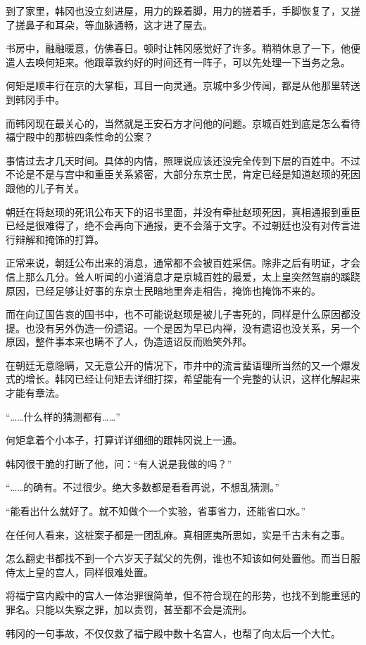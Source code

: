 到了家里，韩冈也没立刻进屋，用力的跺着脚，用力的搓着手，手脚恢复了，又搓了搓鼻子和耳朵，等血脉通畅，这才进了屋去。

书房中，融融暖意，仿佛春日。顿时让韩冈感觉好了许多。稍稍休息了一下，他便遣人去唤何矩来。他跟章敦约好的时间还有一阵子，可以先处理一下当务之急。

何矩是顺丰行在京的大掌柜，耳目一向灵通。京城中多少传闻，都是从他那里转送到韩冈手中。

而韩冈现在最关心的，当然就是王安石方才问他的问题。京城百姓到底是怎么看待福宁殿中的那桩四条性命的公案？

事情过去才几天时间。具体的内情，照理说应该还没完全传到下层的百姓中。不过不论是不是与宫中和重臣关系紧密，大部分东京士民，肯定已经是知道赵顼的死因跟他的儿子有关。

朝廷在将赵顼的死讯公布天下的诏书里面，并没有牵扯赵顼死因，真相通报到重臣已经是很难得了，绝不会再向下通报，更不会落于文字。不过朝廷也没有对传言进行辩解和掩饰的打算。

正常来说，朝廷公布出来的消息，通常都不会被百姓采信。除非之后有明证，才会信上那么几分。耸人听闻的小道消息才是京城百姓的最爱，太上皇突然驾崩的蹊跷原因，已经足够让好事的东京士民暗地里奔走相告，掩饰也掩饰不来的。

而在向辽国告哀的国书中，也不可能说赵顼是被儿子害死的，同样是什么原因都没提。也没有另外伪造一份遗诏。一个是因为早已内禅，没有遗诏也没关系，另一个原因，整件事本来也瞒不了人，伪造遗诏反而贻笑外邦。

在朝廷无意隐瞒，又无意公开的情况下，市井中的流言蜚语理所当然的又一个爆发式的增长。韩冈已经让何矩去详细打探，希望能有一个完整的认识，这样化解起来才能有章法。

“……什么样的猜测都有……”

何矩拿着个小本子，打算详详细细的跟韩冈说上一通。

韩冈很干脆的打断了他，问：“有人说是我做的吗？”

“……的确有。不过很少。绝大多数都是看看再说，不想乱猜测。”

“能看出什么就好了。就不知做个一个实验，省事省力，还能省口水。”

在任何人看来，这桩案子都是一团乱麻。真相匪夷所思如，实是千古未有之事。

怎么翻史书都找不到一个六岁天子弑父的先例，谁也不知该如何处置他。而当日服侍太上皇的宫人，同样很难处置。

将福宁宫内殿中的宫人一体治罪很简单，但不符合现在的形势，也找不到能重惩的罪名。只能以失察之罪，加以责罚，甚至都不会是流刑。

韩冈的一句事故，不仅仅救了福宁殿中数十名宫人，也帮了向太后一个大忙。

